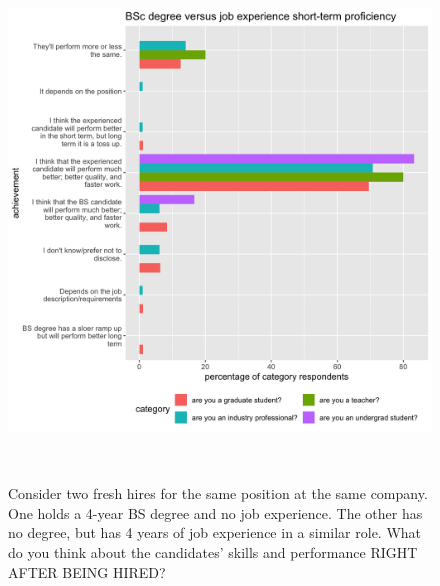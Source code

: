\documentclass{sigchi}
\begin{document}
\begin{figure}
\includegraphics[scale=0.2]{../data-analysis/plots_output/BSc_degree_versus_job_experience_short-term_proficiency.png}
 \caption{Consider two fresh hires for the same position at the same company. One holds a 4-year BS degree and no job experience. The other has no degree, but has 4 years of job experience in a similar role. What do you think about the candidates' skills and performance RIGHT AFTER BEING HIRED?}~\label{fig:figure8}
\end{figure}
\end{document}
